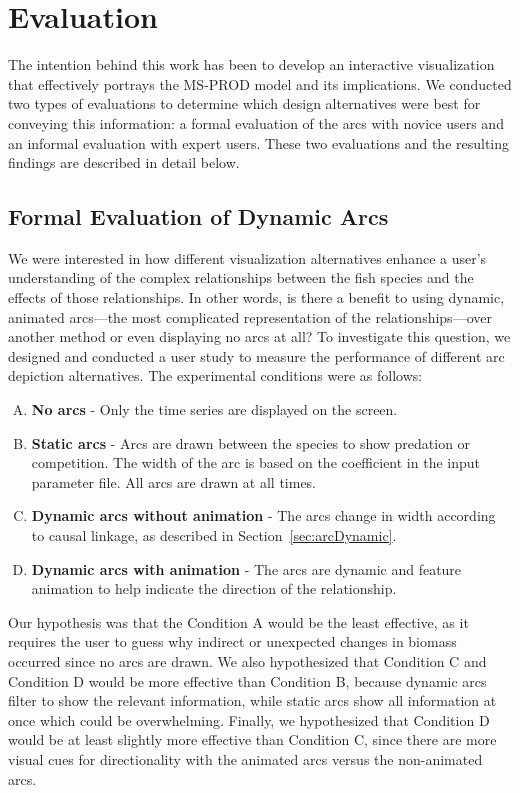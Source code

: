 \chapter{Evaluation}

The intention behind this work has been to develop an interactive visualization that effectively portrays the MS-PROD model and its implications.  We conducted two types of evaluations to determine which design alternatives were best for conveying this information: a formal evaluation of the arcs with novice users and an informal evaluation with expert users.  These two evaluations and the resulting findings are described in detail below. 

\section{Formal Evaluation of Dynamic Arcs}

We were interested in how different visualization alternatives enhance a user's understanding of the complex relationships between the fish species and the effects of those relationships.  In other words, is there a benefit to using dynamic, animated arcs---the most complicated representation of the relationships---over another method or even displaying no arcs at all?  To investigate this question, we designed and conducted a user study to measure the performance of different arc depiction alternatives.  The experimental conditions were as follows:

\begin{enumerate}[(A)]
\item \textbf{No arcs} - Only the time series are displayed on the screen. 
\item \textbf{Static arcs} - Arcs are drawn between the species to show predation or competition.  The width of the arc is based on the coefficient in the input parameter file.  All arcs are drawn at all times.
\item \textbf{Dynamic arcs without animation} - The arcs change in width according to causal linkage, as described in Section~\ref{sec:arcDynamic}.
\item \textbf{Dynamic arcs with animation} - The arcs are dynamic and feature animation to help indicate the direction of the relationship.
\end{enumerate}

Our hypothesis was that the Condition A would be the least effective, as it requires the user to guess why indirect or unexpected changes in biomass occurred since no arcs are drawn.  We also hypothesized that Condition C and Condition D would be more effective than Condition B, because dynamic arcs filter to show the relevant information, while static arcs show all information at once which could be overwhelming.  Finally, we hypothesized that Condition D would be at least slightly more effective than Condition C, since there are more visual cues for directionality with the animated arcs versus the non-animated arcs.

